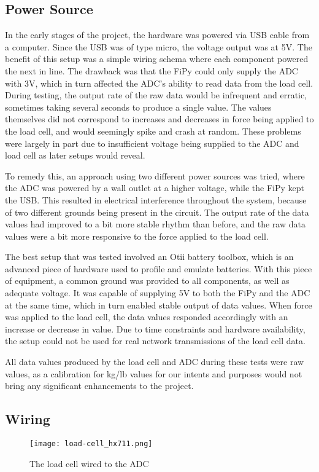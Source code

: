 \subsection{Power Source}
In the early stages of the project, the hardware was powered via USB cable from a computer. Since the USB was of type micro, the voltage output was at 5V. The benefit of this setup was a simple wiring schema where each component powered the next in line. The drawback was that the FiPy could only supply the ADC with 3V, which in turn affected the ADC's ability to read data from the load cell. During testing, the output rate of the raw data would be infrequent and erratic, sometimes taking several seconds to produce a single value. The values themselves did not correspond to increases and decreases in force being applied to the load cell, and would seemingly spike and crash at random. These problems were largely in part due to insufficient voltage being supplied to the ADC and load cell as later setups would reveal.

To remedy this, an approach using two different power sources was tried, where the ADC was powered by a wall outlet at a higher voltage, while the FiPy kept the USB. This resulted in electrical interference throughout the system, because of two different grounds being present in the circuit. The output rate of the data values had improved to a bit more stable rhythm than before, and the raw data values were a bit more responsive to the force applied to the load cell. 

The best setup that was tested involved an Otii battery toolbox, which is an advanced piece of hardware used to profile and emulate batteries.\cite{otii-web} With this piece of equipment, a common ground was provided to all components, as well as adequate voltage. It was capable of supplying 5V to both the FiPy and the ADC at the same time, which in turn enabled stable output of data values. When force was applied to the load cell, the data values responded accordingly with an increase or decrease in value. Due to time constraints and hardware availability, the setup could not be used for real network transmissions of the load cell data.

All data values produced by the load cell and ADC during these tests were raw values, as a calibration for kg/lb values for our intents and purposes would not bring any significant enhancements to the project.

\subsection{Wiring}
\begin{figure}[h]
	\centering
	\texttt{[image: load-cell\_hx711.png]}
	\caption{The load cell wired to the ADC}
	\label{fig:load-cell_hx711}
\end{figure}

